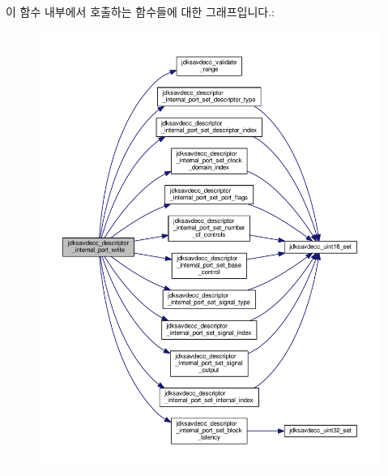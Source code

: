 이 함수 내부에서 호출하는 함수들에 대한 그래프입니다.\+:
\nopagebreak
\begin{figure}[H]
\begin{center}
\leavevmode
\includegraphics[width=350pt]{group__descriptor__internal__port_ga26cd492bc15c8f5aa1e126b573a69dba_cgraph}
\end{center}
\end{figure}


